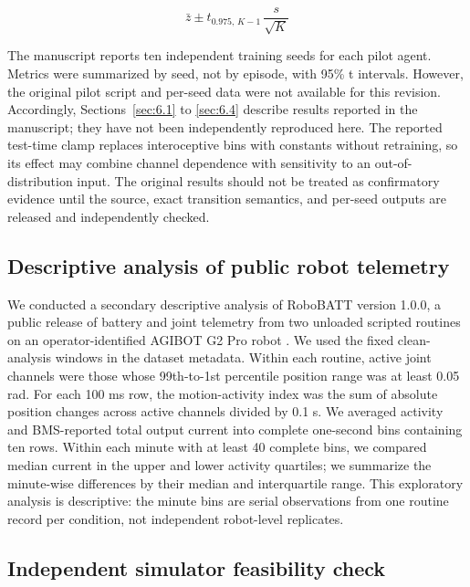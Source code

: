 \documentclass[twoside,11pt]{article}
\begin{document}
\begin{equation}\label{eq:17}
\bar{z}\pm t_{0.975,\,K-1}\,\frac{s}{\sqrt{K}}
\end{equation}

\noindent The manuscript reports ten independent training seeds for each pilot agent. Metrics were summarized by seed, not by episode, with 95\% t intervals. However, the original pilot script and per-seed data were not available for this revision. Accordingly, Sections~\ref{sec:6.1} to \ref{sec:6.4} describe results reported in the manuscript; they have not been independently reproduced here. The reported test-time clamp replaces interoceptive bins with constants without retraining, so its effect may combine channel dependence with sensitivity to an out-of-distribution input. The original results should not be treated as confirmatory evidence until the source, exact transition semantics, and per-seed outputs are released and independently checked.

\subsection{Descriptive analysis of public robot telemetry}\label{sec:5.3}

We conducted a secondary descriptive analysis of RoboBATT version 1.0.0, a public release of battery and joint telemetry from two unloaded scripted routines on an operator-identified AGIBOT G2 Pro robot \citep{guo2026}. We used the fixed clean-analysis windows in the dataset metadata. Within each routine, active joint channels were those whose 99th-to-1st percentile position range was at least 0.05 rad. For each 100 ms row, the motion-activity index was the sum of absolute position changes across active channels divided by 0.1 s. We averaged activity and BMS-reported total output current into complete one-second bins containing ten rows. Within each minute with at least 40 complete bins, we compared median current in the upper and lower activity quartiles; we summarize the minute-wise differences by their median and interquartile range. This exploratory analysis is descriptive: the minute bins are serial observations from one routine record per condition, not independent robot-level replicates.

\subsection{Independent simulator feasibility check}\label{sec:5.4}
\end{document}

